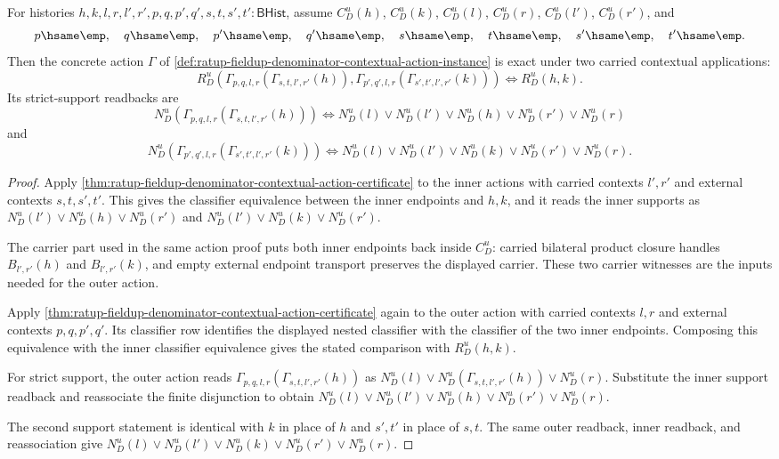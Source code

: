 \begin{theorem}
\label{thm:field-rat-denominator-contextual-action-composition}
For histories $h,k,l,r,l',r',p,q,p',q',s,t,s',t':\mathsf{BHist}$, assume
$C_D^u(h)$, $C_D^u(k)$, $C_D^u(l)$, $C_D^u(r)$, $C_D^u(l')$,
$C_D^u(r')$, and
$$
p\hsame\emp,\quad q\hsame\emp,\quad p'\hsame\emp,\quad q'\hsame\emp,
\quad s\hsame\emp,\quad t\hsame\emp,\quad s'\hsame\emp,\quad t'\hsame\emp.
$$
Then the concrete action $\Gamma$ of
\autoref{def:ratup-fieldup-denominator-contextual-action-instance} is exact
under two carried contextual applications:
$$
R_D^u(\Gamma_{p,q,l,r}(\Gamma_{s,t,l',r'}(h)),
\Gamma_{p',q',l,r}(\Gamma_{s',t',l',r'}(k)))
\Longleftrightarrow R_D^u(h,k).
$$
Its strict-support readbacks are
$$
N_D^u(\Gamma_{p,q,l,r}(\Gamma_{s,t,l',r'}(h)))
\Longleftrightarrow
N_D^u(l)\lor N_D^u(l')\lor N_D^u(h)\lor N_D^u(r')\lor N_D^u(r)
$$
and
$$
N_D^u(\Gamma_{p',q',l,r}(\Gamma_{s',t',l',r'}(k)))
\Longleftrightarrow
N_D^u(l)\lor N_D^u(l')\lor N_D^u(k)\lor N_D^u(r')\lor N_D^u(r).
$$
\end{theorem}
\begin{proof}
Apply
\autoref{thm:ratup-fieldup-denominator-contextual-action-certificate} to the
inner actions with carried contexts $l',r'$ and external contexts
$s,t,s',t'$. This gives the classifier equivalence between the inner endpoints
and $h,k$, and it reads the inner supports as
$N_D^u(l')\lor N_D^u(h)\lor N_D^u(r')$ and
$N_D^u(l')\lor N_D^u(k)\lor N_D^u(r')$.

The carrier part used in the same action proof puts both inner endpoints back
inside $C_D^u$: carried bilateral product closure handles $B_{l',r'}(h)$ and
$B_{l',r'}(k)$, and empty external endpoint transport preserves the displayed
carrier. These two carrier witnesses are the inputs needed for the outer action.

Apply
\autoref{thm:ratup-fieldup-denominator-contextual-action-certificate} again to
the outer action with carried contexts $l,r$ and external contexts
$p,q,p',q'$. Its classifier row identifies the displayed nested classifier with
the classifier of the two inner endpoints. Composing this equivalence with the
inner classifier equivalence gives the stated comparison with $R_D^u(h,k)$.

For strict support, the outer action reads
$\Gamma_{p,q,l,r}(\Gamma_{s,t,l',r'}(h))$ as
$N_D^u(l)\lor N_D^u(\Gamma_{s,t,l',r'}(h))\lor N_D^u(r)$. Substitute the inner
support readback and reassociate the finite disjunction to obtain
$N_D^u(l)\lor N_D^u(l')\lor N_D^u(h)\lor N_D^u(r')\lor N_D^u(r)$.

The second support statement is identical with $k$ in place of $h$ and
$s',t'$ in place of $s,t$. The same outer readback, inner readback, and
reassociation give
$N_D^u(l)\lor N_D^u(l')\lor N_D^u(k)\lor N_D^u(r')\lor N_D^u(r)$.
\end{proof}

